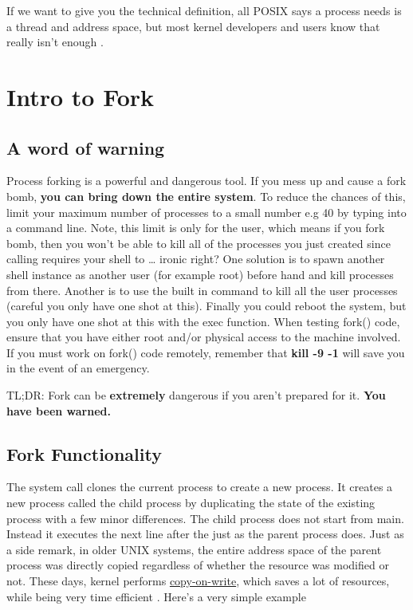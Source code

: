 If we want to give you the technical definition, all POSIX says a process needs is a thread and address space, but most kernel developers and users know that really isn't enough \cite{process_def}.

\section{Intro to Fork}

\subsection{A word of warning}

Process forking is a powerful and dangerous tool.
If you mess up and cause a fork bomb, \textbf{you can bring down the entire system}.
To reduce the chances of this, limit your maximum number of processes to a small number e.g 40 by typing  into a command line.
Note, this limit is only for the user, which means if you fork bomb, then you won't be able to kill all of the processes you just created since calling  requires your shell to  \ldots{} ironic right? One solution is to spawn another shell instance as another user (for example root) before hand and kill processes from there.
Another is to use the built in  command to kill all the user processes (careful you only have one shot at this).
Finally you could reboot the system, but you only have one shot at this with the exec function.
When testing fork() code, ensure that you have either root and/or physical access to the machine involved.
If you must work on fork() code remotely, remember that \textbf{kill -9 -1} will save you in the event of an emergency.

TL;DR: Fork can be \textbf{extremely} dangerous if you aren't prepared for it. \textbf{You have been warned.}

\subsection{Fork Functionality}

The  system call clones the current process to create a new process.
It creates a new process called the child process by duplicating the state of the existing process with a few minor differences.
The child process does not start from main.
Instead it executes the next line after the  just as the parent process does.
Just as a side remark, in older UNIX systems, the entire address space of the parent process was directly copied regardless of whether the resource was modified or not.
These days, kernel performs \href{https://en.wikipedia.org/wiki/Copy-on-write}{copy-on-write}, which saves a lot of resources, while being very time efficient \cite[Copy-on-write section]{Bovet:2005:ULK:1077084}.
Here's a very simple example


